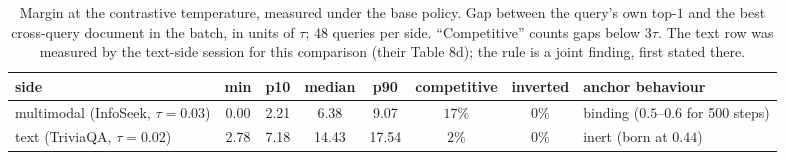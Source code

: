 \begin{table}[t]
\centering\small
\caption{Margin at the contrastive temperature, measured under the base policy. Gap between the
query's own top-$1$ and the best cross-query document in the batch, in units of $\tau$;
$48$ queries per side. ``Competitive'' counts gaps below $3\tau$. The text row was measured by
the text-side session for this comparison (their Table 8d); the rule is a joint finding, first
stated there.}
\label{tab:mm_margin}
\begin{tabular}{lccccccl}
\toprule
side & min & p10 & median & p90 & competitive & inverted & anchor behaviour \\
\midrule
multimodal (InfoSeek, $\tau{=}0.03$) & 0.00 & 2.21 & 6.38 & 9.07 & $17\%$ & $0\%$ & binding ($0.5$--$0.6$ for 500 steps) \\
text (TriviaQA, $\tau{=}0.02$)       & 2.78 & 7.18 & 14.43 & 17.54 & $2\%$  & $0\%$ & inert (born at $0.44$) \\
\bottomrule
\end{tabular}
\end{table}

